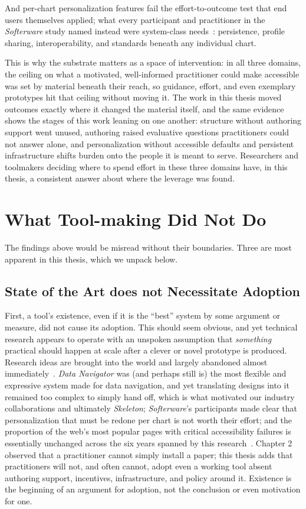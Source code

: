\documentclass[12pt]{cmuthesis}
\begin{document}
And per-chart personalization features fail the effort-to-outcome test that end users themselves applied; what every participant and practitioner in the \textit{Softerware} study named instead were system-class needs~\cite{Fleizach}: persistence, profile sharing, interoperability, and standards beneath any individual chart.

This is why the substrate matters as a space of intervention: in all three domains, the ceiling on what a motivated, well-informed practitioner could make accessible was set by material beneath their reach, so guidance, effort, and even exemplary prototypes hit that ceiling without moving it. The work in this thesis moved outcomes exactly where it changed the material itself, and the same evidence shows the stages of this work leaning on one another: structure without authoring support went unused, authoring raised evaluative questions practitioners could not answer alone, and personalization without accessible defaults and persistent infrastructure shifts burden onto the people it is meant to serve. Researchers and toolmakers deciding where to spend effort in these three domains have, in this thesis, a consistent answer about where the leverage was found.

\section{What Tool-making Did Not Do}

The findings above would be misread without their boundaries. Three are most apparent in this thesis, which we unpack below.

\subsection{State of the Art does not Necessitate Adoption}
First, a tool's existence, even if it is the ``best'' system by some argument or measure, did not cause its adoption. This should seem obvious, and yet technical research appears to operate with an unspoken assumption that \textit{something} practical should happen at scale after a clever or novel prototype is produced. Research ideas are brought into the world and largely abandoned almost immediately~\cite{Hurst2013Making}. \textit{Data Navigator} was (and perhaps still is) the most flexible and expressive system made for data navigation, and yet translating designs into it remained too complex to simply hand off, which is what motivated our industry collaborations and ultimately \textit{Skeleton}; \textit{Softerware}'s participants made clear that personalization that must be redone per chart is not worth their effort; and the proportion of the web's most popular pages with critical accessibility failures is essentially unchanged across the six years spanned by this research~\cite{WebAIMWebAIM}. Chapter 2 observed that a practitioner cannot simply install a paper; this thesis adds that practitioners will not, and often cannot, adopt even a working tool absent authoring support, incentives, infrastructure, and policy around it. Existence is the beginning of an argument for adoption, not the conclusion or even motivation for one.
\end{document}
